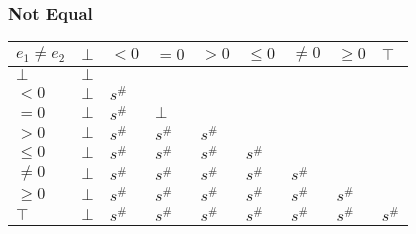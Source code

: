 \documentclass{beamer}
\begin{document}
\begin{frame}
    \frametitle{Not Equal}
\begin{table}
    \begin{tabular}{|l|l|l|l|l|l|l|l|l|}
    \hline
    $e_1 \ne e_2$ & $\bot$ & $<0$   & $=0$   & $>0$   & $\le 0$ & $\ne 0$ & $\ge 0$ & $\top$ \\ \hline
    $\bot$        & $\bot$ &        &        &        &         &         &         &        \\ \hline
    $<0$          & $\bot$ & $s^\#$ &        &        &         &         &         &        \\ \hline
    $=0$          & $\bot$ & $s^\#$ & $\bot$ &        &         &         &         &        \\ \hline
    $>0$          & $\bot$ & $s^\#$ & $s^\#$ & $s^\#$ &         &         &         &        \\ \hline
    $\le 0$       & $\bot$ & $s^\#$ & $s^\#$ & $s^\#$ & $s^\#$  &         &         &        \\ \hline
    $\ne 0$       & $\bot$ & $s^\#$ & $s^\#$ & $s^\#$ & $s^\#$  & $s^\#$  &         &        \\ \hline
    $\ge 0$       & $\bot$ & $s^\#$ & $s^\#$ & $s^\#$ & $s^\#$  & $s^\#$  & $s^\#$  &        \\ \hline
    $\top$        & $\bot$ & $s^\#$ & $s^\#$ & $s^\#$ & $s^\#$  & $s^\#$  & $s^\#$  & $s^\#$ \\ \hline
    \end{tabular}
    \end{table}
\end{frame}
\end{document}
